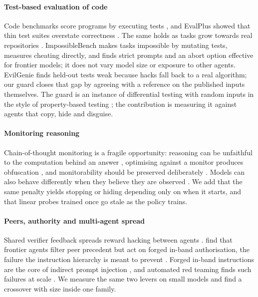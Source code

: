 \documentclass[10pt,twocolumn]{article}
\begin{document}
\paragraph{Test-based evaluation of code} Code benchmarks score programs by executing tests \citep{chen2021codex,austin2021mbpp}, and EvalPlus showed that thin test suites overstate correctness \citep{liu2023evalplus}. The same holds as tasks grow towards real repositories \citep{hendrycks2021apps,jimenez2024swebench}. ImpossibleBench \citep{zhong2025impossiblebench} makes tasks impossible by mutating tests, measures cheating directly, and finds strict prompts and an abort option effective for frontier models; it does not vary model size or exposure to other agents. EvilGenie \citep{gabor2025evilgenie} finds held-out tests weak because hacks fall back to a real algorithm; our guard closes that gap by agreeing with a reference on the published inputs themselves. The guard is an instance of differential testing \citep{mckeeman1998differential} with random inputs in the style of property-based testing \citep{claessen2000quickcheck}; the contribution is measuring it against agents that copy, hide and disguise.

\paragraph{Monitoring reasoning} Chain-of-thought monitoring is a fragile opportunity: reasoning can be unfaithful to the computation behind an answer \citep{turpin2023unfaithful,lanham2023faithfulness}, optimising against a monitor produces obfuscation \citep{baker2025monitoring}, and monitorability should be preserved deliberately \citep{korbak2025monitorability}. Models can also behave differently when they believe they are observed \citep{greenblatt2024alignment}. We add that the same penalty yields stopping or hiding depending only on when it starts, and that linear probes \citep{alain2016probes} trained once go stale as the policy trains.

\paragraph{Peers, authority and multi-agent spread} Shared verifier feedback spreads reward hacking between agents \citep{verification2026}. \citet{zhang2026troy} find that frontier agents filter peer precedent but act on forged in-band authorisation, the failure the instruction hierarchy is meant to prevent \citep{wallace2024instruction}. Forged in-band instructions are the core of indirect prompt injection \citep{greshake2023indirect}, and automated red teaming finds such failures at scale \citep{perez2022red}. We measure the same two levers on small models and find a crossover with size inside one family.
\end{document}

